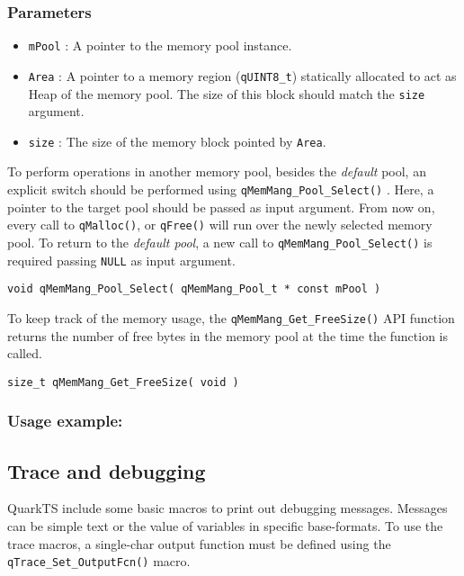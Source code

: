 \subsubsection*{Parameters}
\begin{itemize}
    \item \lstinline{mPool} : A pointer to the memory pool instance. 
    \item \lstinline{Area} :  A pointer to a memory region (\lstinline{qUINT8_t}) statically allocated to act as Heap of the memory pool. The size of this block should match the \lstinline{size} argument.
    \item \lstinline{size} : The size of the memory block pointed by \lstinline{Area}. 
\end{itemize}

To perform operations in another memory pool, besides the \textit{default} pool, an explicit switch should be performed using \lstinline{qMemMang_Pool_Select()} . Here, a pointer to the target pool should be passed as input argument.  From now on, every call to \lstinline{qMalloc()}, or \lstinline{qFree()} will run over the newly selected memory pool. To return to  the \textit{default pool},  a new call to  \lstinline{qMemMang_Pool_Select()} is required passing \lstinline{NULL} as input argument. 
\medskip

\begin{lstlisting}[style=CStyle]
void qMemMang_Pool_Select( qMemMang_Pool_t * const mPool )
\end{lstlisting}

To keep track of the memory usage, the \lstinline{qMemMang_Get_FreeSize()}  API function returns the number of free bytes in the memory pool at the time the function is called.
\medskip

\begin{lstlisting}[style=CStyle]
size_t qMemMang_Get_FreeSize( void )
\end{lstlisting}

\subsubsection*{Usage example:}



\subsection{Trace and debugging}
QuarkTS include some basic macros to print out debugging messages. Messages can be simple text or the value of variables in specific base-formats. 
To use the trace macros, a single-char output function must be defined using the \lstinline{qTrace_Set_OutputFcn()} macro.
\medskip

